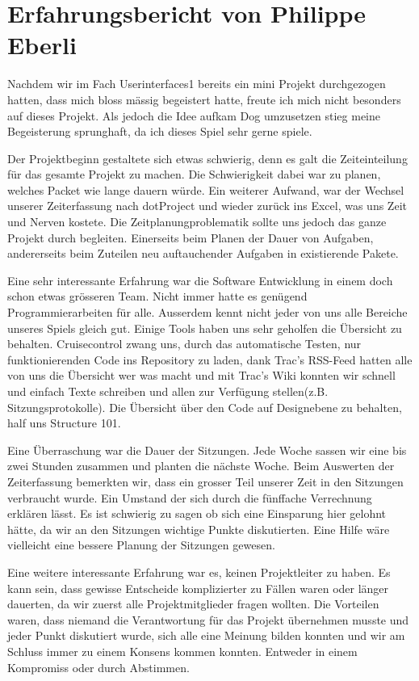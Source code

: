 \documentclass[12pt,halfparskip]{scrartcl}
\begin{document}
\section{Erfahrungsbericht von Philippe Eberli}

Nachdem wir im Fach Userinterfaces1 bereits ein mini Projekt durchgezogen hatten, dass mich bloss mässig begeistert hatte, freute ich mich nicht besonders auf dieses Projekt. Als jedoch die Idee aufkam Dog umzusetzen stieg meine Begeisterung sprunghaft, da ich dieses Spiel sehr gerne spiele.

Der Projektbeginn gestaltete sich etwas schwierig, denn es galt die Zeiteinteilung für das gesamte Projekt zu machen. Die Schwierigkeit dabei war zu planen, welches Packet wie lange dauern würde. Ein weiterer Aufwand, war der Wechsel unserer Zeiterfassung nach dotProject und wieder zurück ins Excel, was uns Zeit und Nerven kostete. Die Zeitplanungproblematik sollte uns jedoch das ganze Projekt durch begleiten. Einerseits beim Planen der Dauer von Aufgaben, andererseits beim Zuteilen neu auftauchender Aufgaben in existierende Pakete.

Eine sehr interessante Erfahrung war die Software Entwicklung in einem doch schon etwas grösseren Team. Nicht immer hatte es genügend Programmierarbeiten für alle. Ausserdem kennt nicht jeder von uns alle Bereiche unseres Spiels gleich gut. Einige Tools haben uns sehr geholfen die Übersicht zu behalten. Cruisecontrol zwang uns, durch das automatische Testen, nur funktionierenden Code ins Repository zu laden, dank Trac's RSS-Feed hatten alle von uns die Übersicht wer was macht und mit Trac's Wiki konnten wir schnell und einfach Texte schreiben und allen zur Verfügung stellen(z.B. Sitzungsprotokolle). Die Übersicht über den Code auf Designebene zu behalten, half uns Structure 101.

Eine Überraschung war die Dauer der Sitzungen. Jede Woche sassen wir eine bis zwei Stunden zusammen und planten die nächste Woche. Beim Auswerten der Zeiterfassung bemerkten wir, dass ein grosser Teil unserer Zeit in den Sitzungen verbraucht wurde. Ein Umstand der sich durch die fünffache Verrechnung erklären lässt. Es ist schwierig zu sagen ob sich eine Einsparung hier gelohnt hätte, da wir an den Sitzungen wichtige Punkte diskutierten. Eine Hilfe wäre vielleicht eine bessere Planung der Sitzungen gewesen.

Eine weitere interessante Erfahrung war es, keinen Projektleiter zu haben. Es kann sein, dass gewisse Entscheide komplizierter zu Fällen waren oder länger dauerten, da wir zuerst alle Projektmitglieder fragen wollten. Die Vorteilen waren, dass niemand die Verantwortung für das Projekt übernehmen musste und jeder Punkt diskutiert wurde, sich alle eine Meinung bilden konnten und wir am Schluss immer zu einem Konsens kommen konnten. Entweder in einem Kompromiss oder durch Abstimmen.
\end{document}
